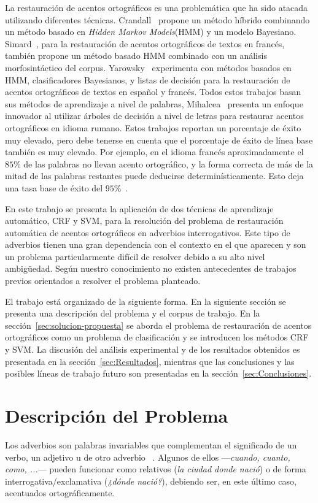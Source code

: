 \documentclass[runningheads,a4paper]{llncs}
\begin{document}
La restauración de acentos ortográficos es una problemática que ha sido atacada utilizando diferentes técnicas. Crandall~\cite{CRANDALL95} propone un método híbrido combinando un método basado en \emph{Hidden Markov Models}(HMM) y un modelo Bayesiano. Simard~\cite{SIMARD98}, para la restauración de acentos ortográficos de textos en francés, también propone un método basado HMM combinado con un análisis morfosintáctico del corpus. Yarowsky~\cite{YAROWSKY94,YAROWSKY94-2} experimenta con métodos basados en HMM, clasificadores Bayesianos, y listas de decisión para la restauración de acentos ortográficos de textos en español y francés. Todos estos trabajos basan sus métodos de aprendizaje a nivel de palabras, Mihalcea~\cite{MIHALCEA02} presenta un enfoque innovador al utilizar árboles de decisión a nivel de letras para restaurar acentos ortográficos en idioma rumano. Estos trabajos reportan un porcentaje de éxito muy elevado, pero debe tenerse en cuenta que el porcentaje de éxito de línea base también es muy elevado. Por ejemplo, en el idioma francés aproximadamente el $85\%$ de las palabras no llevan acento ortográfico, y la forma correcta de más de la mitad de las palabras restantes puede deducirse determinísticamente. Esto deja una tasa base de éxito del $95\%$~\cite{SIMARD98}.

En este trabajo se presenta la aplicación de dos técnicas de aprendizaje automático, CRF y SVM, para la resolución del problema de restauración automática de acentos ortográficos en adverbios interrogativos. Este tipo de adverbios tienen una gran dependencia con el contexto en el que aparecen y son un problema particularmente difícil de resolver debido a su alto nivel ambigüedad. Según nuestro conocimiento no existen antecedentes de trabajos previos orientados a resolver el problema planteado.

El trabajo está organizado de la siguiente forma. En la siguiente sección se presenta una descripción del problema y el corpus de trabajo. En la sección~\ref{sec:solucion-propuesta} se aborda el problema de restauración de acentos ortográficos como un problema de clasificación y se introducen los métodos CRF y SVM. La discusión del análisis experimental y de los resultados obtenidos es presentada en la sección~\ref{sec:Resultados}, mientras que las conclusiones y las posibles líneas de trabajo futuro son presentadas en la sección~\ref{sec:Conclusiones}.

\section{Descripción del Problema}
Los adverbios son palabras invariables que complementan el significado de un verbo, un adjetivo u de otro adverbio ~\cite{RAE}. Algunos de ellos ---\emph{cuando, cuanto, como, ...}--- pueden funcionar como relativos (\emph{la ciudad donde nació}) o de forma interrogativa/exclamativa (\emph{¿dónde nació?}), debiendo ser, en este último caso,  acentuados ortográficamente. 
\end{document}
